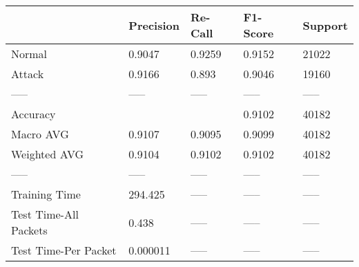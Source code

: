 \begin{tabular}{lllll}
\toprule
{} & Precision & Re-Call & F1-Score & Support \\
\midrule
Normal                &    0.9047 &  0.9259 &   0.9152 &   21022 \\
Attack                &    0.9166 &   0.893 &   0.9046 &   19160 \\
-----                 &     ----- &   ----- &    ----- &   ----- \\
Accuracy              &           &         &   0.9102 &   40182 \\
Macro AVG             &    0.9107 &  0.9095 &   0.9099 &   40182 \\
Weighted AVG          &    0.9104 &  0.9102 &   0.9102 &   40182 \\
-----                 &     ----- &   ----- &    ----- &   ----- \\
Training Time         &   294.425 &   ----- &    ----- &   ----- \\
Test Time-All Packets &     0.438 &   ----- &    ----- &   ----- \\
Test Time-Per Packet  &  0.000011 &   ----- &    ----- &   ----- \\
\bottomrule
\end{tabular}
